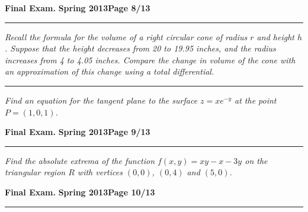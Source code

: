 \documentclass[12pt]{article}
\begin{document}
\hfill{\large\bf Final Exam.}\hfill{\large\bf
  Spring 2013}\hfill{\large\bf Page 8/13}\hrule

\bigskip
{\problem[15 pts] \em Recall the formula for the volume of a right circular cone of radius $r$ and height $h$.  Suppose that the height decreases from 20 to 19.95 inches, and the radius increases from 4 to 4.05 inches.  Compare the change in volume of the cone with an approximation of this change using a total differential.}
\vspace{9cm}
\begin{flushright}
\end{flushright}
\hrule
{\problem[10 pts] \em Find an equation for the tangent plane to the surface $z=xe^{-y}$ at the point $P=(1,0,1)$.}
\vspace{4cm}
\begin{flushright}
\end{flushright}
\newpage

\hfill{\large\bf Final Exam.}\hfill{\large\bf
  Spring 2013}\hfill{\large\bf Page 9/13}\hrule

\bigskip
{\problem[20 pts] \em Find the absolute extrema of the function $f(x,y) = xy-x-3y$ on the triangular region $R$ with vertices $(0,0)$, $(0,4)$ and $(5,0)$.}
\vspace{18.5cm}
\begin{flushright}
\end{flushright}
\newpage


\hfill{\large\bf Final Exam.}\hfill{\large\bf
  Spring 2013}\hfill{\large\bf Page 10/13}\hrule
\end{document}
